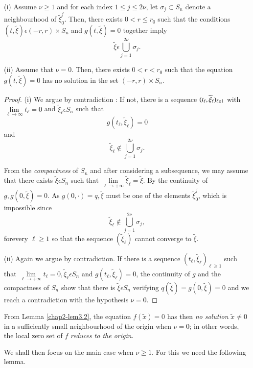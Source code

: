 \begin{lemma}\label{chap2-lem3.2}
(i) Assume $\nu \geq 1$ and for each index $1 \leq j \leq 2\nu$, let
  $\sigma_{j} \subset S_{n}$ denote a neighbourhood of
  $\widetilde{\xi}_{0}^{j}$. Then, there exists $0 < r \leq r_{0}$
  such that the conditions $(t, \widetilde{\xi}) \epsilon (-r, r)
  \times S_{n}$ and $g(t, \widetilde{\xi}) = 0$ together imply
$$
\widetilde{\xi} \epsilon \bigcup\limits_{j=1}^{2\nu} \sigma_{j}.
$$

(ii) Assume that $\nu = 0$. Then, there exists $0 < r < r_{0}$ such
that the equation $g(t, \widetilde{\xi}) = 0$ has no solution in the
set $(-r, r) \times S_{n}$.
\end{lemma}

\begin{proof}
(i) We argue by contradiction : If not, there is a sequence
  $(t_{\ell},\break \widetilde{\xi}_{\ell})_{\ell \geq 1}$ with $\lim\limits_{\ell
    \to \infty} t_{\ell} = 0$ and $\widetilde{\xi}_{\ell} \epsilon
  S_{n}$ such that
$$
g(t_{\ell}, \widetilde{\xi}_{\ell}) = 0
$$
and
$$
\widetilde{\xi}_{\ell} \notin \bigcup\limits_{j=1}^{2\nu} \sigma_{j}.
$$ 

From the {\em compactness} of $S_{n}$ and after considering a
subsequence, we may assume that there exists $\widetilde{\xi} \epsilon
S_{n}$ such that $\lim\limits_{\ell \to + \infty} \widetilde{\xi}_{\ell} =
\widetilde{\xi}$. By the continuity of $g, g(0, \widetilde{\xi}) =
0$. As $g(0, \cdot) = q, \widetilde{\xi}$ must be one of the elements
$\widetilde{\xi}_{0}^{j}$, which is impossible since
$$
\widetilde{\xi}_{\ell} \notin \bigcup\limits_{j=1}^{2\nu} \sigma_{j},
$$ 
for\pageoriginale every $\ell \geq 1$ so that the sequence
$(\widetilde{\xi}_{\ell})$ cannot converge to $\widetilde{\xi}$.

(ii) Again we argue by contradiction. If there is a sequence
$(t_{\ell}, \widetilde{\xi}_{\ell})_{\ell \geq 1}$ such that
$\lim\limits_{\ell \to + \infty} t_{\ell} = 0, \widetilde{\xi}_{\ell}
\epsilon S_{n}$ and $g(t_{\ell}, \widetilde{\xi}_{\ell}) = 0$, the
continuity of $g$ and the compactness of $S_{n}$ show that there is
$\widetilde{\xi} \epsilon S_{n}$ verifying $q(\widetilde{\xi}) = g(0,
\widetilde{\xi}) = 0$ and we reach a contradiction with the hypothesis
$\nu = 0$.
\end{proof}

\begin{remark}\label{chap2-rem3.1}
From Lemma \ref{chap2-lem3.2}, the equation $f(\widetilde{x}) = 0$ has
then {\em no solution} $\widetilde{x} \neq 0$ in a sufficiently small
neighbourhood of the origin when $\nu = 0$; in other words, the local
zero set of $f$ {\em reduces to the origin}.

We shall then focus on the main case when $\nu \geq 1$. For this we
need the following lemma.
\end{remark}

